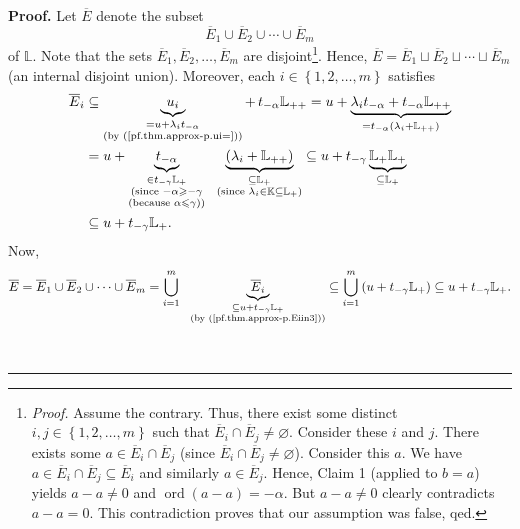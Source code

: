 \documentclass[numbers=enddot,12pt,final,onecolumn,notitlepage]{scrartcl}%
\theoremstyle{definition}
\newenvironment{proof}[1][Proof]{\noindent\textbf{#1.} }{\ \rule{0.5em}{0.5em}}
\let\cupnonlimits\bigcup
\renewcommand{\bigcup}{\cupnonlimits\limits}
\renewcommand{\leq}{\leqslant}
\renewcommand{\geq}{\geqslant}
\theoremstyle{plainsl}
\begin{document}
\begin{proof}
Let $\overline{E}$ denote the subset
\[
\overline{E}_{1}\cup\overline{E}_{2}\cup\cdots\cup\overline{E}_{m}%
\]
of $\mathbb{L}$. Note that the sets $\overline{E}_{1},\overline{E}_{2}%
,\ldots,\overline{E}_{m}$ are disjoint\footnote{\textit{Proof.} Assume the
contrary. Thus, there exist some distinct $i,j\in\left\{  1,2,\ldots
,m\right\}  $ such that $\overline{E}_{i}\cap\overline{E}_{j}\neq\varnothing$.
Consider these $i$ and $j$. There exists some $a\in\overline{E}_{i}%
\cap\overline{E}_{j}$ (since $\overline{E}_{i}\cap\overline{E}_{j}%
\neq\varnothing$). Consider this $a$. We have $a\in\overline{E}_{i}%
\cap\overline{E}_{j}\subseteq\overline{E}_{i}$ and similarly $a\in\overline
{E}_{j}$. Hence, Claim 1 (applied to $b=a$) yields $a-a\neq0$ and
$\operatorname*{ord}\left(  a-a\right)  =-\alpha$. But $a-a\neq0$ clearly
contradicts $a-a=0$. This contradiction proves that our assumption was false,
qed.}. Hence, $\overline{E}=\overline{E}_{1}\sqcup\overline{E}_{2}\sqcup
\cdots\sqcup\overline{E}_{m}$ (an internal disjoint union). Moreover, each
$i\in\left\{  1,2,\ldots,m\right\}  $ satisfies%
\begin{align}
\overline{E}_{i} &  \subseteq\underbrace{u_{i}}_{\substack{=u+\lambda
_{i}t_{-\alpha}\\\text{(by (\ref{pf.thm.approx-p.ui=}))}}}+\,t_{-\alpha
}\mathbb{L}_{++}=u+\underbrace{\lambda_{i}t_{-\alpha}+t_{-\alpha}%
\mathbb{L}_{++}}_{=t_{-\alpha}\left(  \lambda_{i}+\mathbb{L}_{++}\right)
}\nonumber\\
&  =u+\underbrace{t_{-\alpha}}_{\substack{\in t_{-\gamma}\mathbb{L}%
_{+}\\\text{(since }-\alpha\geq-\gamma\\\text{(because }\alpha\leq
\gamma\text{))}}}\ \ \underbrace{\left(  \lambda_{i}+\mathbb{L}_{++}\right)
}_{\substack{\subseteq\mathbb{L}_{+}\\\text{(since }\lambda_{i}\in
\mathbb{K}\subseteq\mathbb{L}_{+}\text{)}}}\subseteq u+t_{-\gamma
}\underbrace{\mathbb{L}_{+}\mathbb{L}_{+}}_{\subseteq\mathbb{L}_{+}%
}\nonumber\\
&  \subseteq u+t_{-\gamma}\mathbb{L}_{+}.\label{pf.thm.approx-p.Eiin3}%
\end{align}
Now,%
\[
\overline{E}=\overline{E}_{1}\cup\overline{E}_{2}\cup\cdots\cup\overline
{E}_{m}=\bigcup_{i=1}^{m}\ \ \underbrace{\overline{E}_{i}}%
_{\substack{\subseteq u+t_{-\gamma}\mathbb{L}_{+}\\\text{(by
(\ref{pf.thm.approx-p.Eiin3}))}}}\subseteq\bigcup_{i=1}^{m}\left(
u+t_{-\gamma}\mathbb{L}_{+}\right)  \subseteq u+t_{-\gamma}\mathbb{L}_{+}.
\]



\end{proof}
\end{document}
